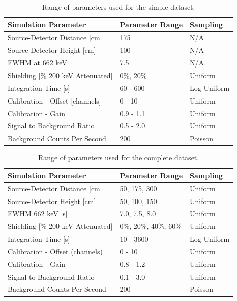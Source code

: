 \begin{table}[H]
\centering
\caption{Range of parameters used for the simple dataset.}
\label{table:hyperparameter_dataset_easy_parameters}
\begin{tabular}{lll}
\hline
\textbf{Simulation Parameter} & \textbf{Parameter Range} & \textbf{Sampling} \\ \hline
Source-Detector Distance [cm] & 175 & N/A \\ 
Source-Detector Height [cm] & 100 & N/A \\ 
FWHM at 662 keV & 7.5 & N/A \\ 
Shielding [\% 200 keV Attenuated] & 0\%, 20\% & Uniform \\ 
Integration Time [s] & 60 - 600 & Log-Uniform \\ 
Calibration - Offset [channels] & 0 - 10 & Uniform \\ 
Calibration - Gain & 0.9 - 1.1 & Uniform \\ 
Signal to Background Ratio & 0.5 - 2.0 & Uniform \\ 
Background Counts Per Second & 200 & Poisson \\ \hline
\end{tabular}
\end{table}


\begin{table}[H]
\centering
\caption{Range of parameters used for the complete dataset.}
\label{table:hyperparameter_dataset_full_parameters}
\begin{tabular}{lll}
\hline
\textbf{Simulation Parameter} & \textbf{Parameter Range} & \textbf{Sampling} \\ \hline
Source-Detector Distance {[}cm{]} & 50, 175, 300 & Uniform \\ 
Source-Detector Height {[}cm{]} & 50, 100, 150 & Uniform \\ 
FWHM 662 keV {[}s{]} & 7.0, 7.5, 8.0 & Uniform \\ 
Shielding [\% 200 keV Attenuated] & 0\%, 20\%, 40\%, 60\% & Uniform \\ 
Integration Time {[}s{]} & 10 - 3600 & Log-Uniform \\ 
Calibration - Offset (channels) & 0 - 10 & Uniform \\ 
Calibration - Gain & 0.8 - 1.2 & Uniform \\ 
Signal to Background Ratio & 0.1 - 3.0 & Uniform \\ 
Background Counts Per Second & 200 & Poisson \\ \hline
\end{tabular}
\end{table}


